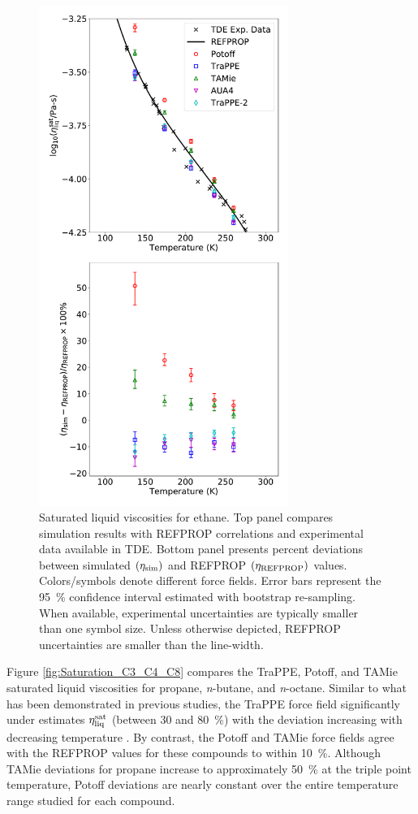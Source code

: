 \documentclass[preprint,review,12pt]{elsarticle}
\begin{document}
	\begin{figure}[htb!]
		\centering
		\includegraphics[width=3.2in]{compare_force_fields_ethane.pdf}
		\caption{Saturated liquid viscosities for ethane. Top panel compares simulation results with REFPROP correlations and experimental data available in TDE. Bottom panel presents percent deviations between simulated $(\eta_{\rm sim})$ and REFPROP $(\eta_{\rm REFPROP})$ values. Colors/symbols denote different force fields. Error bars represent the 95~\% confidence interval estimated with bootstrap re-sampling. When available, experimental uncertainties are typically smaller than one symbol size. Unless otherwise depicted, REFPROP uncertainties are smaller than the line-width.}
		\label{fig:Saturation_Ethane}
	\end{figure} 
	
	Figure \ref{fig:Saturation_C3_C4_C8} compares the TraPPE, Potoff, and TAMie saturated liquid viscosities for propane, \textit{n}-butane, and \textit{n}-octane. Similar to what has been demonstrated in previous studies, the TraPPE force field significantly under estimates $\eta_{\rm liq}^{\rm sat}$ (between 30 and 80~\%) with the deviation increasing with decreasing temperature \cite{Gordon2006,Nieto2006}. By contrast, the Potoff and TAMie force fields agree with the REFPROP values for these compounds to within 10~\%. Although TAMie deviations for propane increase to approximately 50~\% at the triple point temperature, Potoff deviations are nearly constant over the entire temperature range studied for each compound. 
	
\end{document}
